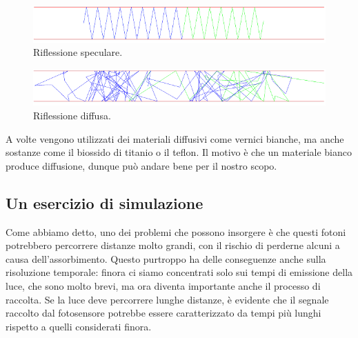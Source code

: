 \begin{figure}[H]
   \centering
   \includegraphics[width=\textwidth]{immagini/riflessione_speculare.png}
   \caption*{Riflessione speculare.}
\end{figure}
\begin{figure}[H]
   \centering
   \includegraphics[width=\textwidth]{immagini/riflessione_diffusa.png}
   \caption*{Riflessione diffusa.}
\end{figure}

A volte vengono utilizzati dei materiali diffusivi come vernici bianche, ma anche sostanze come il biossido di titanio o il teflon. Il motivo è che un materiale bianco produce diffusione, dunque può andare bene per il nostro scopo. 

\subsection{Un esercizio di simulazione}

Come abbiamo detto, uno dei problemi che possono insorgere è che questi fotoni potrebbero percorrere distanze molto grandi, con il rischio di perderne alcuni a causa dell'assorbimento. Questo purtroppo ha delle conseguenze anche sulla risoluzione temporale: finora ci siamo concentrati solo sui tempi di emissione della luce, che sono molto brevi, ma ora diventa importante anche il processo di raccolta. Se la luce deve percorrere lunghe distanze, è evidente che il segnale raccolto dal fotosensore potrebbe essere caratterizzato da tempi più lunghi rispetto a quelli considerati finora.

